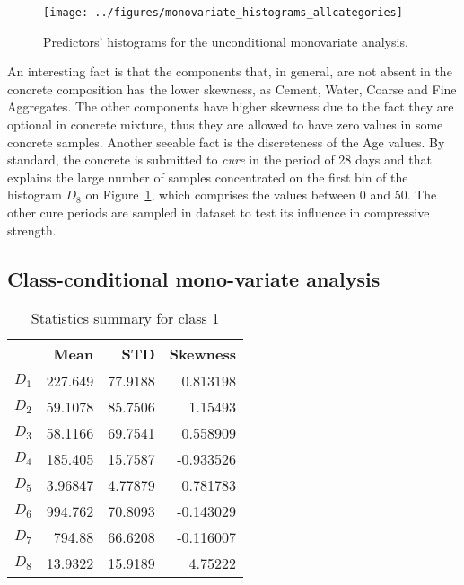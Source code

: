 \documentclass[conference]{IEEEtran}
\begin{document}
\begin{figure}[htbp]
\centerline{\texttt{[image: ../figures/monovariate\_histograms\_allcategories]}}
\caption{Predictors' histograms for the unconditional monovariate analysis.}
\label{uncond_monovariate}
\end{figure}

An interesting fact is that the components that, in general, are not absent in the concrete composition has the lower skewness, as Cement, Water, Coarse and Fine Aggregates. The other components have higher skewness due to the fact they are optional in concrete mixture, thus they are allowed to have zero values in some concrete samples. Another seeable fact is the discreteness of the Age values. By standard, the concrete is submitted to \emph{cure} in the period of 28 days and that explains the large number of samples concentrated on the first bin of the histogram $D_8$ on Figure~\ref{uncond_monovariate}, which comprises the values between 0 and 50. The other cure periods are sampled in dataset to test its influence in compressive strength.

\subsection{Class-conditional mono-variate analysis}

\begin{table}[htp]
  \caption{Statistics summary for class 1}
    \centering
    \begin{tabular}{@{} crrr @{}}
      \toprule
       & Mean & STD & Skewness \\ 
      \midrule
      $D_1$ & 227.649  &   77.9188  &   0.813198 \\ 
      $D_2$ & 59.1078  &  85.7506  &   1.15493 \\ 
      $D_3$ & 58.1166  &  69.7541   &  0.558909 \\ 
      $D_4$ & 185.405  &   15.7587  &  -0.933526\\ 
      $D_5$ & 3.96847  &  4.77879  &  0.781783 \\ 
      $D_6$ & 994.762   &  70.8093  &  -0.143029 \\ 
      $D_7$ & 794.88   &   66.6208  &  -0.116007 \\ 
      $D_8$ & 13.9322  &  15.9189  &   4.75222 \\       
      \bottomrule
    \end{tabular}
  \label{statistics_table_class_1}
  \end{table}%
\end{document}
